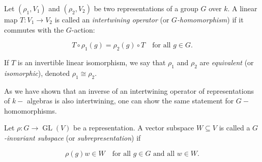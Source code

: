 \begin{definition}[$G$-Homomorphism]

Let $(\rho_1, V_1)$ and $(\rho_2, V_2)$ be two representations of a group $G$ over $k$. A linear map $T \colon V_1 \to V_2$ is called an \emph{intertwining operator} (or \emph{$G$-homomorphism}) if it commutes with the $G$-action:

\[
T \circ \rho_1(g) = \rho_2(g) \circ T \quad \text{for all } g \in G.
\]

 If $T$ is an invertible linear isomorphism, we say that $\rho_1$ and $\rho_2$ are \emph{equivalent} (or \emph{isomorphic}), denoted $\rho_1 \cong \rho_2$.


\end{definition}
As we have shown that an inverse of an intertwining operator of representations of $k-$ algebras is also intertwining, one can show the same statement for $G-$homomorphisms.
\begin{definition}[Subrepresentation]

Let $\rho \colon G \to \operatorname{GL}(V)$ be a representation. A vector subspace $W \subseteq V$ is called a \emph{$G$-invariant subspace} (or \emph{subrepresentation}) if

\[
\rho(g)w \in W \quad \text{for all } g \in G \text{ and all } w \in W.
\]

\end{definition}

